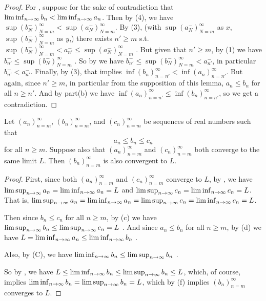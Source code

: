\begin{proof}
For , suppose for the sake of contradiction that \(\liminf_{n \to \infty} b_n < \liminf_{n \to \infty} a_n\).
Then by (4), we have \(\sup (b_N^-)_{N = m}^{\infty} < \sup (a_N^-)_{N = m}^{\infty}\).
By (3), (with \(\sup (a_N^-)_{N = m}^{\infty}\) as \(x\), \(\sup (b_N^-)_{N = m}^{\infty}\) as \(y\),) there exists \(n' \ge m\) s.t. \(\sup (b_N^-)_{N = m}^{\infty} < a_{n'}^- \le \sup (a_N^-)_{N = m}^{\infty}\) .
But given that \(n' \ge m\), by (1) we have \(b_{n'}^- \le \sup (b_N^-)_{N = m}^{\infty}\) .
So by  we have \(b_{n'}^- \le \sup (b_N^-)_{N = m}^{\infty} < a_{n'}^-\), in particular \(b_{n'}^- < a_{n'}^-\).
Finally, by (3), that implies \(\inf(b_n)_{n = n'}^{\infty} < \inf(a_n)_{n = n'}^{\infty}\).
But again, since \(n' \ge m\), in particular from the supposition of this lemma, \(a_n \le b_n\) for all \(n \ge n'\).
And by part(b) we have \(\inf(a_n)_{n = n'}^{\infty} \le \inf(b_n)_{n = n'}^{\infty}\), so we get a contradiction.
\end{proof}

\begin{corollary}  \label{corollary 6.4.14}
Let \((a_n)_{n = m}^{\infty}\), \((b_n)_{n = m}^{\infty}\), and \((c_n)_{n = m}^{\infty}\) be sequences of real numbers such that
\[
    a_n \le b_n \le c_n
\]
for all \(n \ge m\).
Suppose also that \((a_n)_{n = m}^{\infty}\) and \((c_n)_{n = m}^{\infty}\) both converge to the same limit \(L\).
Then \((b_n)_{n = m}^{\infty}\) is also convergent to \(L\).
\end{corollary}

\begin{proof}
\sloppy First, since both \((a_n)_{n = m}^{\infty}\) and \((c_n)_{n = m}^{\infty}\) converge to \(L\), by ,
we have \(\limsup_{n \to \infty} a_n = \liminf_{n \to \infty} a_n = L\) and \(\limsup_{n \to \infty} c_n = \liminf_{n \to \infty} c_n = L\).
That is, \(\limsup_{n \to \infty} a_n = \liminf_{n \to \infty} a_n = \limsup_{n \to \infty} c_n = \liminf_{n \to \infty} c_n = L\).

Then since \(b_n \le c_n\) for all \(n \ge m\), by (c) we have \(\limsup_{n \to \infty} b_n \le \limsup_{n \to \infty} c_n = L\) .
And since \(a_n \le b_n\) for all \(n \ge m\), by (d) we have \(L = \liminf_{n \to \infty} a_n \le \liminf_{n \to \infty} b_n\) .

Also, by (C), we have \(\liminf_{n \to \infty} b_n \le \limsup_{n \to \infty} b_n\) .

So by , we have \(L \le \liminf_{n \to \infty} b_n \le \limsup_{n \to \infty} b_n \le L\),
which, of course, implies \(\liminf_{n \to \infty} b_n = \limsup_{n \to \infty} b_n = L\),
which by (f) implies \((b_n)_{n = m}^{\infty}\) converges to \(L\).
\end{proof}

